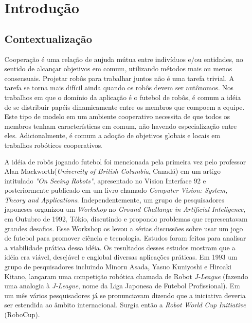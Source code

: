 \chapter{Introdução}

\section{Contextualização}

Cooperação é uma relação de aujuda mútua entre indivíduos e/ou entidades, no sentido
de alcançar objetivos em comum, utilizando métodos mais ou menos consensuais. Projetar
robôs para trabalhar juntos não é uma tarefa trivial. A tarefa se torna mais difícil
ainda quando os robôs devem ser autônomos. Nos trabalhos em que o domínio da aplicação
é o futebol de robôs, é comum a idéia de se distribuir papéis dinamicamente entre os
membros que compoem a equipe. Este tipo de modelo em um ambiente cooperativo necessita
de que todos os membros tenham características em comum, não havendo especialização
entre eles. Adicionalmente, é comum a adoção de objetivos globais e locais em
trabalhos robóticos cooperativos.

A idéia de robôs jogando futebol foi mencionada pela primeira vez pelo professor
Alan Mackworth(\textit{Univercity of British Columbia}, Canadá) em um artigo intitulado
\textit{"On Seeing Robots"}, apresentado no Vision Interface 92 e posteriormente publicado em
um livro chamado \textit{Computer Vision: System, Theory and Applications}. Independentemente,
um grupo de pesquisadores japoneses organizou um \textit{Workshop} no \textit{Ground Challange in Artificial Inteligence}, em Outubro de 1992, Tókio, discutindo e propondo problemas que representavam grandes desafios. Esse Workshop os levou a sérias discussões sobre 
usar um jogo de futebol para promover ciência e tecnologia. Estudos foram feitos para
analisar a viabilidade prática dessa idéia. Os resultados desses estudos mostram que
a idéia era viável, desejável e englobal diversas aplicações práticas. Em 1993 um
grupo de pesquisadores incluindo Minoru Asada, Yasuo Kuniyoshi e Hiroaki Kitano,
lançaram uma competição robótica chamada de Robot \textit{J-League} (fazendo uma analogia à
\textit{J-League}, nome da Liga Japonesa de Futebol Profissional). Em um mês vários 
pesquisadores já se pronunciavam dizendo que a iniciativa deveria ser estendida ao 
âmbito internacional. Surgia então a \textit{Robot World Cup Initiative} (RoboCup).

